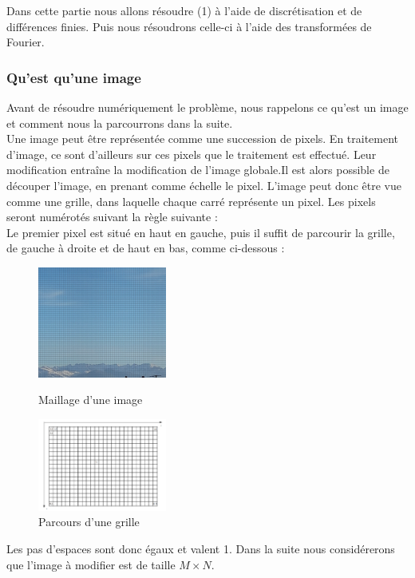 Dans cette partie nous allons résoudre (1) à l'aide de discrétisation et de différences finies. Puis nous résoudrons celle-ci à l'aide des transformées de Fourier. \\
\subsubsection{Qu'est qu'une image}
Avant de résoudre numériquement le problème, nous rappelons ce qu'est un image et comment nous la  parcourrons dans la suite.\\
Une image peut être représentée comme une succession de pixels. En traitement d'image, ce sont d'ailleurs sur ces pixels que le traitement est effectué. Leur modification entraîne la modification de l'image globale.Il est alors possible de découper l'image, en prenant comme échelle le pixel. L'image peut donc être vue comme une grille, dans laquelle chaque carré représente un pixel. Les pixels seront numérotés suivant la règle suivante : \\

Le premier pixel est situé en haut en gauche, puis il suffit de parcourir la grille, de gauche à droite et de haut en bas, comme ci-dessous :  
\begin{figure}[!h]
   \begin{minipage}{0.5\textwidth}
     \centering
     \includegraphics[width = 120pt]{Images/Montagne_grille.jpg}
        \caption{Maillage d'une image}
      \end{minipage}\hfill
   \begin{minipage}{0.5\textwidth}
     \centering
     \includegraphics[width = 120pt]{Images/grille.png}
	\caption{Parcours d'une grille}
      \end{minipage}\hfill
\end{figure}

Les pas d'espaces sont donc égaux et valent 1. Dans la suite nous considérerons que l'image à modifier est de taille $M \times N$.

